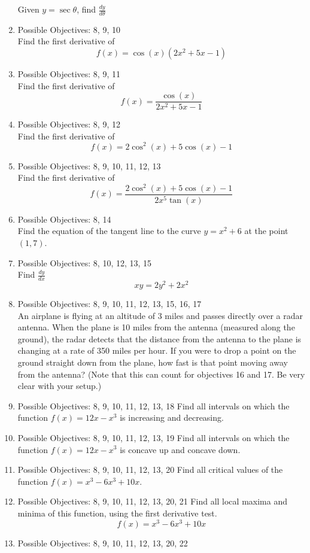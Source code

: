 \documentclass{exam}
\begin{document}
\begin{enumerate}
Given $y = \sec{\theta}$, find $\frac{dy}{d\theta}$
\item Possible Objectives: 8, 9, 10\\
Find the first derivative of $$f(x) = \cos(x)(2x^2 + 5x-1)$$
\item Possible Objectives: 8, 9, 11\\
Find the first derivative of $$f(x) = \frac{\cos(x)}{2x^2 + 5x-1}$$
\item Possible Objectives: 8, 9, 12\\ 
Find the first derivative of $$f(x) = 2\cos^2(x) + 5\cos(x)-1$$
\item Possible Objectives: 8, 9, 10, 11, 12, 13\\
Find the first derivative of $$f(x) = \frac{2\cos^2(x) + 5\cos(x)-1}{2x^5\tan(x)}$$
\item Possible Objectives: 8, 14\\
Find the equation of the tangent line to the curve $y = x^2 + 6$ at the point $(1,7)$.
\item Possible Objectives: 8, 10, 12, 13, 15\\
Find $\frac{dy}{dx}$
$$xy = 2y^2 + 2x^2$$
\item Possible Objectives: 8, 9, 10, 11, 12, 13, 15, 16, 17\\
An airplane is flying at an altitude of 3 miles and passes directly over a radar antenna. When the plane is 10 miles from the antenna (measured along the ground), the radar detects that the distance from the antenna to the plane is changing at a rate of 350 miles per hour. If you were to drop a point on the ground straight down from the plane, how fast is that point moving away from the antenna? (Note that this can count for objectives 16 and 17. Be very clear with your setup.)
\item Possible Objectives: 8, 9, 10, 11, 12, 13, 18
Find all intervals on which the function $f(x) = 12x - x^3$ is increasing and decreasing.
\item Possible Objectives: 8, 9, 10, 11, 12, 13, 19
Find all intervals on which the function $f(x) = 12x - x^3$ is concave up and concave down.
\item Possible Objectives: 8, 9, 10, 11, 12, 13, 20
Find all critical values of the function $f(x) = x^3 - 6x^3 + 10x$.
\item Possible Objectives: 8, 9, 10, 11, 12, 13, 20, 21
Find all local maxima and minima of this function, using the first derivative test.
$$f(x) = x^3 - 6x^3 + 10x$$
\item Possible Objectives: 8, 9, 10, 11, 12, 13, 20, 22

\end{enumerate}
\end{document}
